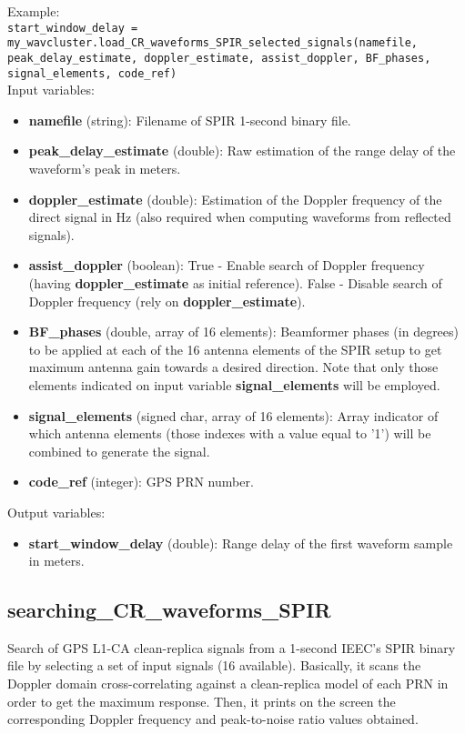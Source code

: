 Example:\\

\texttt{start\_window\_delay = my\_wavcluster.load\_CR\_waveforms\_SPIR\_selected\_signals(namefile, peak\_delay\_estimate, doppler\_estimate, assist\_doppler, BF\_phases, signal\_elements, code\_ref)}\\

Input variables:
\begin{itemize}
\item {\bf namefile} (string): Filename of SPIR 1-second binary file.
\item {\bf peak\_delay\_estimate} (double): Raw estimation of the range delay of the waveform's peak in meters.
\item {\bf doppler\_estimate} (double): Estimation of the Doppler frequency of the direct signal in Hz (also required when computing waveforms from reflected signals).
\item {\bf assist\_doppler} (boolean): True - Enable search of Doppler frequency (having {\bf doppler\_estimate} as initial reference). False - Disable search of Doppler frequency (rely on {\bf doppler\_estimate}).
\item {\bf BF\_phases} (double, array of 16 elements): Beamformer phases (in degrees) to be applied at each of the 16 antenna elements of the SPIR setup to get maximum antenna gain towards a desired direction. Note that only those elements indicated on input variable {\bf signal\_elements} will be employed.
\item {\bf signal\_elements} (signed char, array of 16 elements): Array indicator of which antenna elements (those indexes with a value equal to '1') will be combined to generate the signal.
\item {\bf code\_ref} (integer): GPS PRN number. 
\end{itemize}

Output variables:
\begin{itemize}
\item {\bf start\_window\_delay} (double): Range delay of the first waveform sample in meters.
\end{itemize}


\subsection{searching\_CR\_waveforms\_SPIR}

Search of GPS L1-CA clean-replica signals from a 1-second IEEC's SPIR binary file by selecting a set of input signals (16 available). Basically, it scans the Doppler domain cross-correlating against a clean-replica model of each PRN in order to get the maximum response. Then, it prints on the screen the corresponding Doppler frequency and peak-to-noise ratio values obtained.\\

